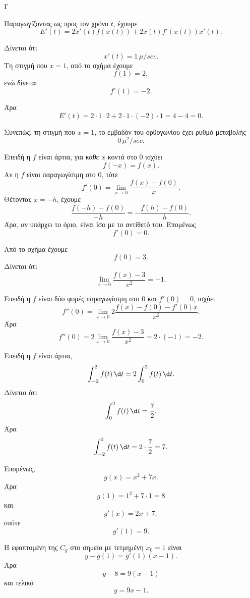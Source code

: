 \begin{thema}{Γ}
\begin{erwthma}
Παραγωγίζοντας ως προς τον χρόνο $t$, έχουμε
\[
E'(t)=2x'(t)f(x(t))+2x(t)f'(x(t))x'(t).
\]

Δίνεται ότι
\[
x'(t)=1\,\mu/\si{sec}.
\]
Τη στιγμή που $x=1$, από το σχήμα έχουμε
\[
f(1)=2,
\]
ενώ δίνεται
\[
f'(1)=-2.
\]

Άρα
\[
E'(t)=2\cdot 1\cdot 2+2\cdot 1\cdot (-2)\cdot 1=4-4=0.
\]

Συνεπώς, τη στιγμή που $x=1$, το εμβαδόν του ορθογωνίου έχει ρυθμό μεταβολής
\[
0\,\mu^2/\si{sec}.
\]

\item Επειδή η $f$ είναι άρτια, για κάθε $x$ κοντά στο $0$ ισχύει
\[
f(-x)=f(x).
\]
Αν η $f$ είναι παραγωγίσιμη στο $0$, τότε
\[
f'(0)=\lim_{x\to 0}\frac{f(x)-f(0)}{x}.
\]
Θέτοντας $x=-h$, έχουμε
\[
\frac{f(-h)-f(0)}{-h}
=-\frac{f(h)-f(0)}{h}.
\]
Άρα, αν υπάρχει το όριο, είναι ίσο με το αντίθετό του. Επομένως
\[
f'(0)=0.
\]

Από το σχήμα έχουμε
\[
f(0)=3.
\]
Δίνεται ότι
\[
\lim_{x\to 0}\frac{f(x)-3}{x^2}=-1.
\]

Επειδή η $f$ είναι δύο φορές παραγωγίσιμη στο $0$ και $f'(0)=0$, ισχύει
\[
f''(0)=\lim_{x\to 0}2\frac{f(x)-f(0)-f'(0)x}{x^2}.
\]
Άρα
\[
f''(0)=2\lim_{x\to 0}\frac{f(x)-3}{x^2}=2\cdot(-1)=-2.
\]

\item Επειδή η $f$ είναι άρτια,
\[
\int_{-2}^{2} f(t)\,\d t=2\int_0^2 f(t)\,\d t.
\]
Δίνεται ότι
\[
\int_0^2 f(t)\,\d t=\frac{7}{2}.
\]
Άρα
\[
\int_{-2}^{2} f(t)\,\d t=2\cdot \frac{7}{2}=7.
\]

Επομένως,
\[
g(x)=x^2+7x.
\]
Άρα
\[
g(1)=1^2+7\cdot 1=8
\]
και
\[
g'(x)=2x+7,
\]
οπότε
\[
g'(1)=9.
\]

Η εφαπτομένη της $C_g$ στο σημείο με τετμημένη $x_0=1$ είναι
\[
y-g(1)=g'(1)(x-1).
\]
Άρα
\[
y-8=9(x-1)
\]
και τελικά
\[
y=9x-1.
\]
\end{erwthma}
\end{thema}




